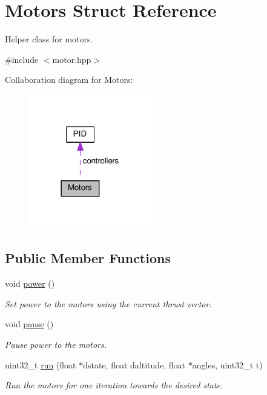 \hypertarget{structMotors}{}\section{Motors Struct Reference}
\label{structMotors}


Helper class for motors.  




{\ttfamily \#include $<$motor.\+hpp$>$}



Collaboration diagram for Motors\+:\nopagebreak
\begin{figure}[H]
\begin{center}
\leavevmode
\includegraphics[width=153pt]{structMotors__coll__graph}
\end{center}
\end{figure}
\subsection*{Public Member Functions}
\begin{DoxyCompactItemize}
\item 
\mbox{\label{structMotors_ac6532a754e5f1743ee4975b6722b4054}} 
void \hyperlink{structMotors_ac6532a754e5f1743ee4975b6722b4054}{power} ()
\begin{DoxyCompactList}\small\item\em Set power to the motors using the current thrust vector. \end{DoxyCompactList}\item 
\mbox{\label{structMotors_a179c6a24115935994a13493f74f56df8}} 
void \hyperlink{structMotors_a179c6a24115935994a13493f74f56df8}{pause} ()
\begin{DoxyCompactList}\small\item\em Pause power to the motors. \end{DoxyCompactList}\item 
uint32\+\_\+t \hyperlink{structMotors_adfcaebaa831f46e37b33757ad2c131f8}{run} (float $\ast$dstate, float daltitude, float $\ast$angles, uint32\+\_\+t t)
\begin{DoxyCompactList}\small\item\em Run the motors for one iteration towards the desired state. \end{DoxyCompactList}\end{DoxyCompactItemize}
